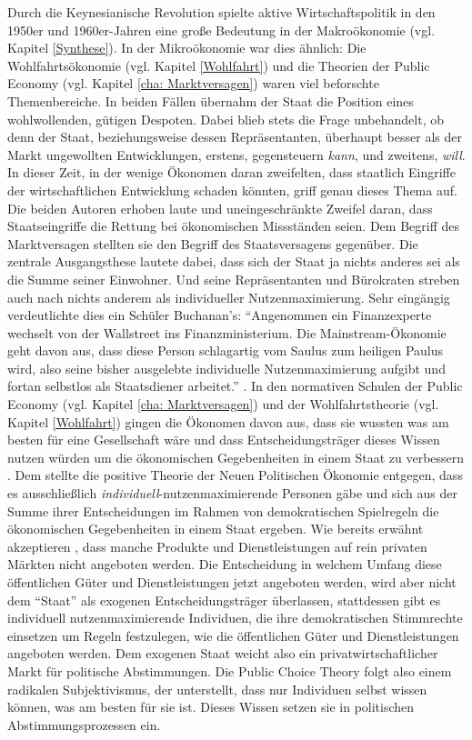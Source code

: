 Durch die Keynesianische Revolution spielte aktive Wirtschaftspolitik in den 1950er und 1960er-Jahren eine große Bedeutung in der Makroökonomie (vgl. Kapitel \ref{Synthese}). In der Mikroökonomie war dies ähnlich: Die Wohlfahrtsökonomie (vgl. Kapitel \ref{Wohlfahrt}) und die Theorien der Public Economy (vgl. Kapitel \ref{cha: Marktversagen}) waren viel beforschte Themenbereiche. In beiden Fällen übernahm der Staat die Position eines wohlwollenden, gütigen Despoten. Dabei blieb stets die Frage unbehandelt, ob denn der Staat, beziehungsweise dessen Repräsentanten, überhaupt besser als der Markt ungewollten Entwicklungen, erstens, gegensteuern \textit{kann}, und zweitens, \textit{will}. In dieser Zeit, in der wenige Ökonomen daran zweifelten, dass staatlich Eingriffe der wirtschaftlichen Entwicklung schaden könnten, griff \textcite{Buchanan1962} genau dieses Thema auf. Die beiden Autoren erhoben laute und uneingeschränkte Zweifel daran, dass Staatseingriffe die Rettung bei ökonomischen Missständen seien. Dem Begriff des Marktversagen stellten sie den Begriff des Staatsversagens gegenüber. Die zentrale Ausgangsthese lautete dabei, dass sich der Staat ja nichts anderes sei als die Summe seiner Einwohner. Und seine Repräsentanten und Bürokraten streben auch nach nichts anderem als individueller Nutzenmaximierung. Sehr eingängig verdeutlichte dies ein Schüler Buchanan's: "`Angenommen ein Finanzexperte wechselt von der Wallstreet ins Finanzministerium. Die Mainstream-Ökonomie geht davon aus, dass diese Person schlagartig vom Saulus zum heiligen Paulus wird, also seine bisher ausgelebte individuelle Nutzenmaximierung aufgibt und fortan selbstlos als Staatsdiener arbeitet."' \parencite[S. 96]{Warsh}. In den normativen Schulen der Public Economy (vgl. Kapitel \ref{cha: Marktversagen}) und der Wohlfahrtstheorie (vgl. Kapitel \ref{Wohlfahrt}) gingen die Ökonomen davon aus, dass sie wussten was am besten für eine Gesellschaft wäre und dass Entscheidungsträger dieses Wissen nutzen würden um die ökonomischen Gegebenheiten in einem Staat zu verbessern \parencite[S. 167]{Romer1988}. Dem stellte die positive Theorie der Neuen Politischen Ökonomie entgegen, dass es ausschließlich \textit{individuell}-nutzenmaximierende Personen gäbe und sich aus der Summe ihrer Entscheidungen im Rahmen von demokratischen Spielregeln die ökonomischen Gegebenheiten in einem Staat ergeben. Wie bereits erwähnt akzeptieren \textcite{Buchanan1962}, dass manche Produkte und Dienstleistungen auf rein privaten Märkten nicht angeboten werden. Die Entscheidung in welchem Umfang diese öffentlichen Güter und Dienstleistungen jetzt angeboten werden, wird aber nicht dem "`Staat"' als exogenen Entscheidungsträger überlassen, stattdessen gibt es individuell nutzenmaximierende Individuen, die ihre demokratischen Stimmrechte einsetzen um Regeln festzulegen, wie die öffentlichen Güter und Dienstleistungen angeboten werden. Dem exogenen Staat weicht also ein privatwirtschaftlicher Markt für politische Abstimmungen. Die Public Choice Theory folgt also einem radikalen Subjektivismus, der unterstellt, dass nur Individuen selbst wissen können, was am besten für sie ist. Dieses Wissen setzen sie in politischen Abstimmungsprozessen ein. 
